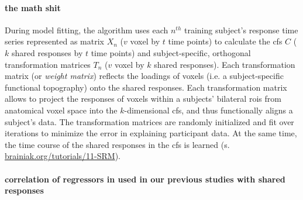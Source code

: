 \paragraph{the math shit}


During model fitting, the algorithm uses each $n^{th}$ training subject's
response time series represented as matrix $X_{n}$ ({$v$} voxel by $t$ time
points) to calculate the \ac{cfs} $C$ ($k$ shared responses by $t$ time points)
and subject-specific, orthogonal transformation matrices $T_{n}$ ($v$ voxel by
$k$ shared responses).
Each transformation matrix (or \textit{weight matrix}) reflects the loadings of
voxels (i.e. a subject-specific functional topography) onto the shared
responses.
Each transformation matrix allows to project the responses of voxels within a
subjects' bilateral \acp{roi} from anatomical voxel space into the
$k$-dimensional \ac{cfs}, and thus functionally aligns a subject's data.
The transformation matrices are randomly initialized and fit over iterations to
minimize the error in explaining participant data.
%
At the same time, the time course of the shared responses in the \ac{cfs} is
learned (s.
\href{https://brainiak.org/tutorials/11-SRM/}{\url{brainiak.org/tutorials/11-SRM}}).



\paragraph{correlation of regressors in used in our previous studies with shared
responses}



